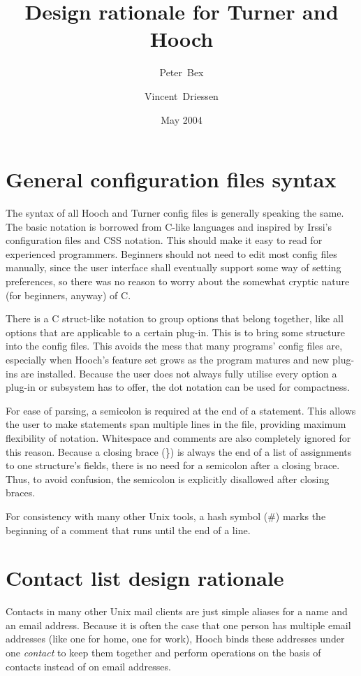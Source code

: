 \documentclass[a4paper]{article}
\title{Design rationale for Turner and Hooch}
\date{May 2004}
\author{Peter~Bex\and{}Vincent~Driessen}
\begin{document}
\maketitle

\section{General configuration files syntax}

The syntax of all Hooch and Turner config files is generally speaking the same.
The basic notation is borrowed from C-like languages and inspired by
Irssi's configuration files and CSS notation.  This should make it easy
to read for experienced programmers.  Beginners should not need to edit
most config files manually, since the user interface shall eventually
support some way of setting preferences, so there was no reason to worry
about the somewhat cryptic nature (for beginners, anyway) of C.

There is a C struct-like notation to group options that belong together,
like all options that are applicable to a certain plug-in.  This is to
bring some structure into the config files.  This avoids the mess that
many programs' config files are, especially when Hooch's feature set grows
as the program matures and new plug-ins are installed.
Because the user does not always fully utilise every option a plug-in or
subsystem has to offer, the dot notation can be used for compactness.

For ease of parsing, a semicolon is required at the end of a statement.
This allows the user to make statements span multiple lines in the file,
providing maximum flexibility of notation.  Whitespace and comments are
also completely ignored for this reason.  Because a closing brace (\}) is
always the end of a list of assignments to one structure's fields, there
is no need for a semicolon after a closing brace.  Thus, to avoid confusion,
the semicolon is explicitly disallowed after closing braces.

For consistency with many other Unix tools, a hash symbol (\#) marks the
beginning of a comment that runs until the end of a line.


\section{Contact list design rationale}

Contacts in many other Unix mail clients are just simple aliases for a
name and an email address.  Because it is often the case that one
person has multiple email addresses (like one for home, one for work),
Hooch binds these addresses under one \emph{contact} to keep them together
and perform operations on the basis of contacts instead of on email
addresses.
\end{document}

